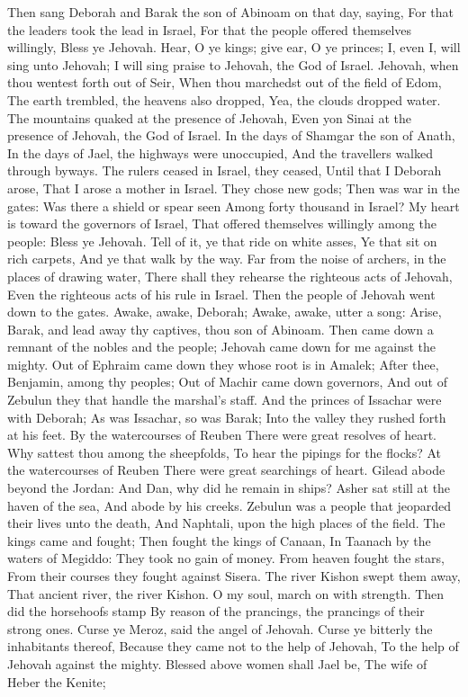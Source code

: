 Then sang Deborah and Barak the son of Abinoam on that day, saying,  For that the leaders took the lead in Israel, For that the people offered themselves willingly, Bless ye Jehovah.  Hear, O ye kings; give ear, O ye princes; I, even I, will sing unto Jehovah; I will sing praise to Jehovah, the God of Israel.  Jehovah, when thou wentest forth out of Seir, When thou marchedst out of the field of Edom, The earth trembled, the heavens also dropped, Yea, the clouds dropped water.  The mountains quaked at the presence of Jehovah, Even yon Sinai at the presence of Jehovah, the God of Israel.  In the days of Shamgar the son of Anath, In the days of Jael, the highways were unoccupied, And the travellers walked through byways.  The rulers ceased in Israel, they ceased, Until that I Deborah arose, That I arose a mother in Israel.  They chose new gods; Then was war in the gates: Was there a shield or spear seen Among forty thousand in Israel?  My heart is toward the governors of Israel, That offered themselves willingly among the people: Bless ye Jehovah.  Tell of it, ye that ride on white asses, Ye that sit on rich carpets, And ye that walk by the way.  Far from the noise of archers, in the places of drawing water, There shall they rehearse the righteous acts of Jehovah, Even the righteous acts of his rule in Israel. Then the people of Jehovah went down to the gates.  Awake, awake, Deborah; Awake, awake, utter a song: Arise, Barak, and lead away thy captives, thou son of Abinoam.  Then came down a remnant of the nobles and the people; Jehovah came down for me against the mighty.  Out of Ephraim came down they whose root is in Amalek; After thee, Benjamin, among thy peoples; Out of Machir came down governors, And out of Zebulun they that handle the marshal’s staff.  And the princes of Issachar were with Deborah; As was Issachar, so was Barak; Into the valley they rushed forth at his feet. By the watercourses of Reuben There were great resolves of heart.  Why sattest thou among the sheepfolds, To hear the pipings for the flocks? At the watercourses of Reuben There were great searchings of heart.  Gilead abode beyond the Jordan: And Dan, why did he remain in ships? Asher sat still at the haven of the sea, And abode by his creeks.  Zebulun was a people that jeoparded their lives unto the death, And Naphtali, upon the high places of the field.  The kings came and fought; Then fought the kings of Canaan, In Taanach by the waters of Megiddo: They took no gain of money.  From heaven fought the stars, From their courses they fought against Sisera.  The river Kishon swept them away, That ancient river, the river Kishon. O my soul, march on with strength.  Then did the horsehoofs stamp By reason of the prancings, the prancings of their strong ones.  Curse ye Meroz, said the angel of Jehovah. Curse ye bitterly the inhabitants thereof, Because they came not to the help of Jehovah, To the help of Jehovah against the mighty.  Blessed above women shall Jael be, The wife of Heber the Kenite; 